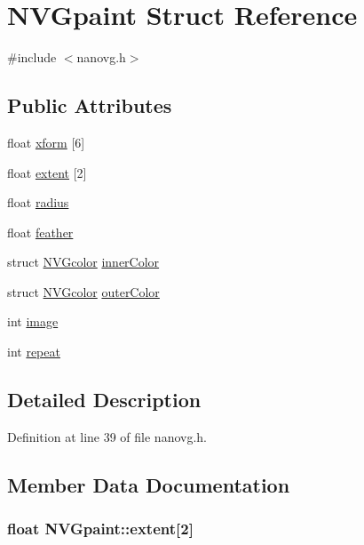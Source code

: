\hypertarget{struct_n_v_gpaint}{\section{N\+V\+Gpaint Struct Reference}
\label{struct_n_v_gpaint}
}


{\ttfamily \#include $<$nanovg.\+h$>$}

\subsection*{Public Attributes}
\begin{DoxyCompactItemize}
\item 
float \hyperlink{struct_n_v_gpaint_a2f486f2a6c76c0fd46a6ea58aa587194}{xform} \mbox{[}6\mbox{]}
\item 
float \hyperlink{struct_n_v_gpaint_ac70c34226c6bd29053cc8bfb29bc8dd0}{extent} \mbox{[}2\mbox{]}
\item 
float \hyperlink{struct_n_v_gpaint_a796f17e83ffd2f59d7a48a5c0e062c55}{radius}
\item 
float \hyperlink{struct_n_v_gpaint_abab7d2a8c04a8964f8e3bf25d2c523af}{feather}
\item 
struct \hyperlink{struct_n_v_gcolor}{N\+V\+Gcolor} \hyperlink{struct_n_v_gpaint_aeccf092ff8f25f886d64db03b51af9e3}{inner\+Color}
\item 
struct \hyperlink{struct_n_v_gcolor}{N\+V\+Gcolor} \hyperlink{struct_n_v_gpaint_a4044b05ab26b48a15a68b6fd30993211}{outer\+Color}
\item 
int \hyperlink{struct_n_v_gpaint_ab6baf3fc279d73bf2de69390e8eb05d2}{image}
\item 
int \hyperlink{struct_n_v_gpaint_a7f46b3d46ef04390791bdf1b032ef594}{repeat}
\end{DoxyCompactItemize}


\subsection{Detailed Description}


Definition at line 39 of file nanovg.\+h.



\subsection{Member Data Documentation}
\hypertarget{struct_n_v_gpaint_ac70c34226c6bd29053cc8bfb29bc8dd0}{
\subsubsection[{extent}]{\setlength{\rightskip}{0pt plus 5cm}float N\+V\+Gpaint\+::extent\mbox{[}2\mbox{]}}}\label{struct_n_v_gpaint_ac70c34226c6bd29053cc8bfb29bc8dd0}



